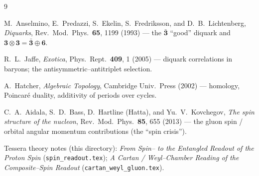 \documentclass[11pt,oneside]{article}
\newcommand{\code}[1]{\texttt{#1}}
\newcommand{\bn}{\bar{\mathbf{3}}}
\newcommand{\thr}{\mathbf{3}}
\newcommand{\six}{\mathbf{6}}
\theoremstyle{plain}
\begin{document}
\begin{thebibliography}{9}

 M.~Anselmino, E.~Predazzi, S.~Ekelin, S.~Fredriksson, and
  D.~B.~Lichtenberg, \emph{Diquarks}, Rev.\ Mod.\ Phys.\ \textbf{65}, 1199 (1993)
  --- the $\bn$ ``good'' diquark and $\thr\otimes\thr=\bn\oplus\six$.

 R.~L.~Jaffe, \emph{Exotica}, Phys.\ Rept.\ \textbf{409}, 1 (2005)
  --- diquark correlations in baryons; the antisymmetric--antitriplet selection.

 A.~Hatcher, \emph{Algebraic Topology}, Cambridge Univ.\ Press
  (2002) --- homology, Poincar\'e duality, additivity of periods over cycles.

 C.~A.~Aidala, S.~D.~Bass, D.~Hartline (Hatta), and
  Yu.~V.~Kovchegov, \emph{The spin structure of the nucleon}, Rev.\ Mod.\ Phys.\
  \textbf{85}, 655 (2013) --- the gluon spin / orbital angular momentum
  contributions (the ``spin crisis'').

 Tessera theory notes (this directory):
  \emph{From Spin--\textonehalf{} to the Entangled Readout of the Proton Spin}
  (\code{spin\_readout.tex}); \emph{A Cartan / Weyl--Chamber
  Reading of the Composite--Spin Readout} (\code{cartan\_weyl\_gluon.tex}).

\end{thebibliography}
\end{document}
